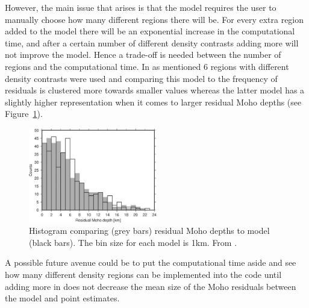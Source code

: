 However, the main issue that arises is that the model requires the user to manually choose how many different regions there will be. For every extra region added to the model there will be an exponential increase in the computational time, and after a certain number of different density contrasts adding more will not improve the model. Hence a trade-off is needed between the number of regions and the computational time. In \cite{Haas2020} as mentioned 6 regions with different density contrasts were used and comparing this model to \cite{Uieda2016} the frequency of residuals is clustered more towards smaller values whereas the latter model has a slightly higher representation when it comes to larger residual Moho depths (see Figure~\ref{fig:Haas_Uieda}).
\begin{figure}[h]
  \begin{center}
    \includegraphics[width=0.5\textwidth]{figures/Haas-Uieda}
  \end{center}
  \caption{
   Histogram comparing \cite{Haas2020} (grey bars) residual Moho depths to \cite{Uieda2016} model (black bars). The bin size for each model is 1km. From \cite{Haas2020}.
  }
  \label{fig:Haas_Uieda}
\end{figure}
A possible future avenue could be to put the computational time aside and see how many different density regions can be implemented into the code until adding more in does not decrease the mean size of the Moho residuals between the model and point estimates.